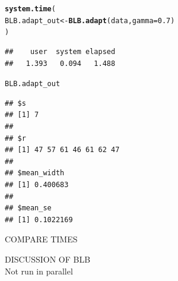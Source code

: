 \documentclass{article}\usepackage[]{graphicx}\usepackage[]{color}
\makeatletter
\newcommand{\hlnum}[1]{\textcolor[rgb]{0.686,0.059,0.569}{#1}}%
\newcommand{\hlstd}[1]{\textcolor[rgb]{0.345,0.345,0.345}{#1}}%
\newcommand{\hlkwb}[1]{\textcolor[rgb]{0.69,0.353,0.396}{#1}}%
\newcommand{\hlkwc}[1]{\textcolor[rgb]{0.333,0.667,0.333}{#1}}%
\newcommand{\hlkwd}[1]{\textcolor[rgb]{0.737,0.353,0.396}{\textbf{#1}}}%
\newenvironment{kframe}{%
 \def\at@end@of@kframe{}%
 \ifinner\ifhmode%
  \def\at@end@of@kframe{\end{minipage}}%
  \begin{minipage}{\columnwidth}%
 \fi\fi%
 \def\FrameCommand##1{\hskip\@totalleftmargin \hskip-\fboxsep
 \colorbox{shadecolor}{##1}\hskip-\fboxsep
     \hskip-\linewidth \hskip-\@totalleftmargin \hskip\columnwidth}%
 \MakeFramed {\advance\hsize-\width
   \@totalleftmargin\z@ \linewidth\hsize
   \@setminipage}}%
 {\par\unskip\endMakeFramed%
 \at@end@of@kframe}
\newenvironment{knitrout}{}{} %
\makeatother
\begin{document}
\begin{knitrout}
\color{fgcolor}\begin{kframe}
\begin{alltt}
\hlkwd{system.time}\hlstd{(}
  \hlstd{BLB.adapt_out} \hlkwb{<-} \hlkwd{BLB.adapt}\hlstd{(data,} \hlkwc{gamma}\hlstd{=}\hlnum{0.7}\hlstd{)}
\hlstd{)}
\end{alltt}
\begin{verbatim}
##    user  system elapsed 
##   1.393   0.094   1.488
\end{verbatim}
\begin{alltt}
\hlstd{BLB.adapt_out}
\end{alltt}
\begin{verbatim}
## $s
## [1] 7
## 
## $r
## [1] 47 57 61 46 61 62 47
## 
## $mean_width
## [1] 0.400683
## 
## $mean_se
## [1] 0.1022169
\end{verbatim}
\end{kframe}
\end{knitrout}

COMPARE TIMES

DISCUSSION OF BLB\\
Not run in parallel

\printbibliography
\end{document}
